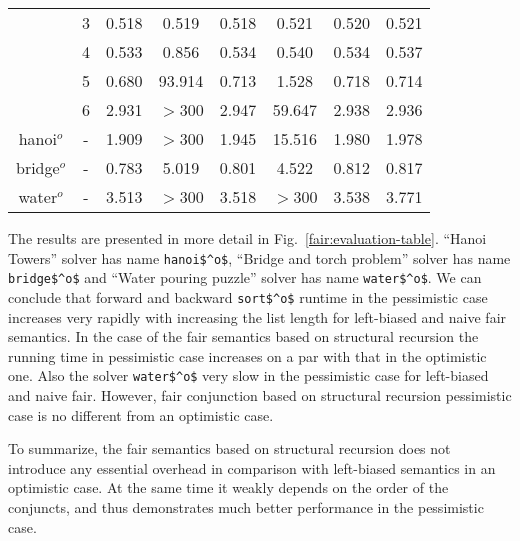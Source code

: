\begin{figure*}
\begin{tabular}{ c | c | c | c | c | c | c | c }
                 & 3    & 0.518 &  0.519 & 0.518 & 0.521  & 0.520 & 0.521 \\
                 & 4    & 0.533 &  0.856 & 0.534 & 0.540  & 0.534 & 0.537 \\
                 & 5    & 0.680 & 93.914 & 0.713 & 1.528  & 0.718 & 0.714 \\
                 & 6    & 2.931 & $>$300 & 2.947 & 59.647 & 2.938 & 2.936 \\
    \hline
    hanoi$^o$    & -    & 1.909 & $>$300 & 1.945 & 15.516 & 1.980 & 1.978 \\
    \hline
    bridge$^o$   & -    & 0.783 & 5.019  & 0.801 & 4.522  & 0.812 & 0.817 \\
    \hline
    water$^o$    & -    & 3.513 & $>$300 & 3.518 & $>$300 & 3.538 & 3.771

  \end{tabular}
  \caption{The results of evaluation: running times of benchmarks in seconds}
  \label{fair:evaluation-table}
\end{figure*}

The results are presented in more detail in Fig.~\ref{fair:evaluation-table}. ``Hanoi Towers'' solver has name \lstinline{hanoi$^o$}, ``Bridge and torch problem'' solver has name \lstinline{bridge$^o$} and ``Water pouring puzzle'' solver has name \lstinline{water$^o$}. We can conclude that forward and backward \lstinline{sort$^o$} runtime in the pessimistic case increases very rapidly with increasing the list length for left-biased and naive fair semantics. In the case of the fair semantics based on structural recursion the running time in pessimistic case increases on a par with that in the optimistic one. Also the solver \lstinline{water$^o$} very slow in the pessimistic case for left-biased and naive fair. However, fair conjunction based on structural recursion pessimistic case is no different from an optimistic case.


To summarize, the fair semantics based on structural recursion does not introduce any essential overhead in comparison with left-biased semantics in an optimistic case. At the same time it
weakly depends on the order of the conjuncts, and thus demonstrates much better performance in the pessimistic case.

